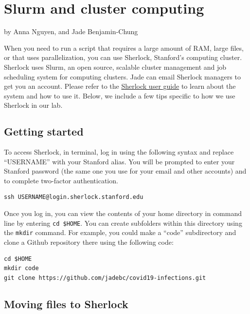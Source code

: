 \documentclass[
]{book}
\begin{document}
\hypertarget{slurm}{%
\chapter{Slurm and cluster computing}\label{slurm}}

by Anna Nguyen, and Jade Benjamin-Chung

When you need to run a script that requires a large amount of RAM, large files, or that uses parallelization, you can use Sherlock, Stanford's computing cluster. Sherlock uses Slurm, an open source, scalable cluster management and job scheduling system for computing clusters. Jade can email Sherlock managers to get you an account. Please refer to the \href{https://www.sherlock.stanford.edu/docs/overview/introduction/}{Sherlock user guide} to learn about the system and how to use it. Below, we include a few tips specific to how we use Sherlock in our lab.

\hypertarget{getting-started}{%
\section{Getting started}\label{getting-started}}

To access Sherlock, in terminal, log in using the following syntax and replace ``USERNAME'' with your Stanford alias. You will be prompted to enter your Stanford password (the same one you use for your email and other accounts) and to complete two-factor authentication.

\begin{verbatim}
ssh USERNAME@login.sherlock.stanford.edu
\end{verbatim}

Once you log in, you can view the contents of your home directory in command line by entering \texttt{cd\ \$HOME}. You can create subfolders within this directory using the \texttt{mkdir} command. For example, you could make a ``code'' subdirectory and clone a Github repository there using the following code:

\begin{verbatim}
cd $HOME
mkdir code
git clone https://github.com/jadebc/covid19-infections.git
\end{verbatim}

\hypertarget{moving-files-to-sherlock}{%
\section{Moving files to Sherlock}\label{moving-files-to-sherlock}}
\end{document}
